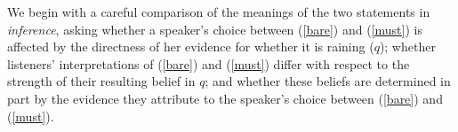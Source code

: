 \documentclass[11pt]{article}
\newcommand{\red}[1]{\textcolor{Red}{#1}}
\begin{document}
We begin with a careful comparison of the meanings of the two statements in \emph{inference},
%
%
%
%
%
%
asking whether a speaker's choice between (\ref{bare}) and (\ref{must}) is affected by the directness of her evidence for whether it is raining ($q$); whether listeners' interpretations of  (\ref{bare}) and (\ref{must})  differ with respect to the strength of their resulting belief in $q$; and whether these beliefs are determined in part by the evidence they attribute to the speaker's choice between (\ref{bare}) and (\ref{must}).
\end{document}
